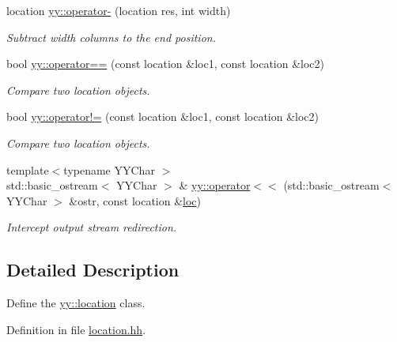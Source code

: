 \begin{DoxyCompactItemize}
location \hyperlink{namespaceyy_a9b8304a3c3584980893db5d974c08d01}{yy\-::operator-\/} (location res, int width)
\begin{DoxyCompactList}\small\item\em Subtract {\itshape width} columns to the end position. \end{DoxyCompactList}\item 
bool \hyperlink{namespaceyy_a466b6e3dcf6a743bb058bf4989b38047}{yy\-::operator==} (const location \&loc1, const location \&loc2)
\begin{DoxyCompactList}\small\item\em Compare two location objects. \end{DoxyCompactList}\item 
bool \hyperlink{namespaceyy_aa3a5c205bc084696bb894634ae9cce80}{yy\-::operator!=} (const location \&loc1, const location \&loc2)
\begin{DoxyCompactList}\small\item\em Compare two location objects. \end{DoxyCompactList}\item 
{\footnotesize template$<$typename Y\-Y\-Char $>$ }\\std\-::basic\-\_\-ostream$<$ Y\-Y\-Char $>$ \& \hyperlink{namespaceyy_a0406f2358d6ba6b06648ff66f3508aad}{yy\-::operator$<$$<$} (std\-::basic\-\_\-ostream$<$ Y\-Y\-Char $>$ \&ostr, const location \&\hyperlink{_genesys_09_09-scanner_8cpp_abaf70dc7df8e78acc6505d164cb2276b}{loc})
\begin{DoxyCompactList}\small\item\em Intercept output stream redirection. \end{DoxyCompactList}\end{DoxyCompactItemize}


\subsection{Detailed Description}
Define the \hyperlink{classyy_1_1location}{yy\-::location} class. 

Definition in file \hyperlink{location_8hh_source}{location.\-hh}.

